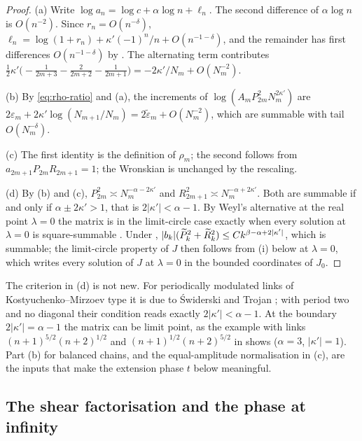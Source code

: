 \begin{proof}
(a) Write $\log a_n=\log c+\alpha\log n+\ell_n$. The second difference of $\alpha\log n$
is $O(n^{-2})$. Since $r_n=O(n^{-\delta})$,
$\ell_n=\log(1+r_n)+\kappa'(-1)^n/n+O(n^{-1-\delta})$, and the remainder has first
differences $O(n^{-1-\delta})$ by . The alternating term contributes
$\tfrac12\kappa'\bigl(-\tfrac{1}{2m+3}-\tfrac{2}{2m+2}-\tfrac1{2m+1}\bigr)
=-2\kappa'/N_m+O(N_m^{-2})$.

(b) By \eqref{eq:rho-ratio} and (a), the increments of
$\log(A_mP_{2m}^2N_m^{2\kappa'})$ are $2\varepsilon_m+2\kappa'\log(N_{m+1}/N_m)
=2\tilde\varepsilon_m+O(N_m^{-2})$, which are summable with tail $O(N_m^{-\delta})$.

(c) The first identity is the definition of $\rho_m$; the second follows from
$a_{2m+1}P_{2m}R_{2m+1}=1$; the Wronskian is unchanged by the rescaling.

(d) By (b) and (c), $P_{2m}^2\asymp N_m^{-\alpha-2\kappa'}$ and
$R_{2m+1}^2\asymp N_m^{-\alpha+2\kappa'}$. Both are summable if and only if
$\alpha\pm2\kappa'>1$, that is $2|\kappa'|<\alpha-1$. By Weyl's alternative at the real
point $\lambda=0$ the matrix is in the limit-circle case exactly when every solution at
$\lambda=0$ is square-summable \cite[Thm.~3]{Simon1998}. Under ,
$|b_k|(\widetilde P_k^2+\widetilde R_k^2)\le Ck^{\beta-\alpha+2|\kappa'|}$, which is summable; the
limit-circle property of $J$ then follows from (i) below at
$\lambda=0$, which writes every solution of $J$ at $\lambda=0$ in the bounded
coordinates of $J_0$.
\end{proof}

\begin{remark}
The criterion in (d) is not new. For periodically modulated links of
Kostyuchenko--Mirzoev type it is due to \'Swiderski and Trojan
\cite[Prop.~6.10 with Thm.~6.3]{SwiderskiTrojan2022}; with period two and no diagonal
their condition reads exactly $2|\kappa'|<\alpha-1$. At the boundary $2|\kappa'|=\alpha-1$
the matrix can be limit point, as the example with links $(n+1)^{5/2}(n+2)^{1/2}$ and
$(n+1)^{1/2}(n+2)^{5/2}$ in \cite[\S10, remarks to Prop.~10.4]{ReiffensteinWoracek2025}
shows ($\alpha=3$, $|\kappa'|=1$). Part (b) for balanced chains, and the
equal-amplitude normalisation in (c), are the inputs that make the extension phase
$t$ below meaningful.
\end{remark}

\subsection{The shear factorisation and the phase at infinity}

